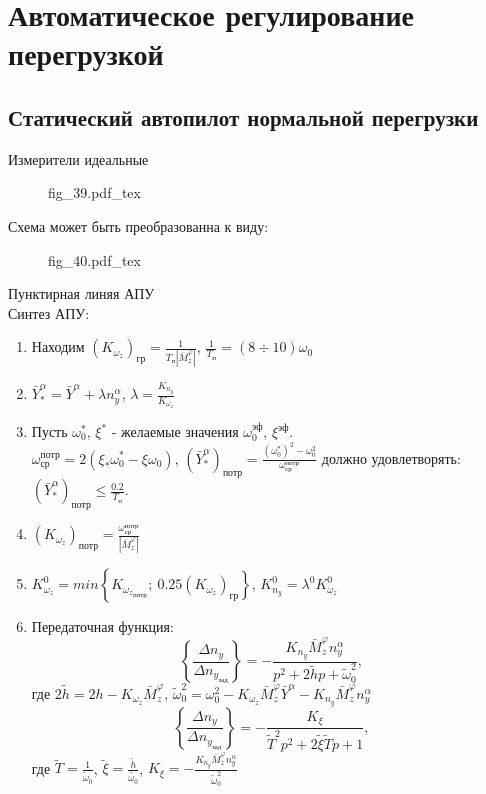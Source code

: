 \documentclass{article}
\begin{document}
\section{Автоматическое регулирование перегрузкой}
\subsection{Статический автопилот нормальной перегрузки}
Измерители идеальные 
\begin{figure}[H]
	\centering
	{fig_39.pdf_tex}
\end{figure}

Схема может быть преобразованна к виду:

\begin{figure}[H]
	\centering
	{fig_40.pdf_tex}
\end{figure}

Пунктирная линяя АПУ\\
Синтез АПУ:
\begin{enumerate}
	\item Находим $(K_{\omega_z})_\text{гр} =\frac{1}{T_\text{п} |\bar{M}_z^{\varphi}|}$, $\frac{1}{T_\text{п}} = (8 \div 10)\omega_0$
	\item $\bar{Y}_*^\alpha =\bar{Y}^\alpha + \lambda n_y^\alpha$, $\lambda = \frac{K_{n_y}}{K_{\omega_z}}$
	\item Пусть $\omega_0^*$, $\xi^*$ - желаемые значения $\omega_0^{\text{эф}}$, $\xi^{\text{эф}}$.\\
	      $\omega_\text{ср}^\text{потр} = 2 (\xi_* \omega_0^* - \xi \omega_0)$, $(\bar{Y}_*^\alpha)_\text{потр} = \frac{(\omega_0^*)^2 - \omega_0^2}{\omega_\text{ср}^\text{потр}}$
	      должно удовлетворять: $(\bar{Y}_*^\alpha)_\text{потр} \leq \frac{0.2}{T_\text{п}}$.
	\item $(K_{\omega_z})_\text{потр} = \frac{\omega_\text{ср}^\text{потр}}{|\bar{M}_z^\varphi|}$
	\item $K_{\omega_z}^0 = min \left\{ K_{{\omega_z}_\text{потр}};\ 0.25(K_{\omega_z})_\text{гр} \right\}$, $K_{n_y}^0 = \lambda^0 K_{\omega_z}^0$
	\item Передаточная функция:
	      \[
		      \left\{\frac{\Delta n_y}{\Delta n_{y_\text{зад}}} \right\}  = -\frac{K_{n_y}\bar{M}_z^\varphi n_y^\alpha }{p^2 + 2 \tilde{h} p + \tilde{\omega}_0^2},
	      \]
	      где $2 \tilde{h} = 2h - K_{\omega_z} \bar{M}_z^\varphi$, $\tilde{\omega}^{2}_0= \omega_0^2 - K_{\omega_z} \bar{M}_z^\varphi \bar{Y}^\alpha - K_{n_y} \bar{M}_z^\varphi n_y^\alpha$
	      \[
		      \left\{\frac{\Delta n_y}{\Delta n_{y_\text{зад}}} \right\} = -\frac{K_{\xi}}{\tilde{T}^2 p^2 + 2 \tilde{\xi} \tilde{T}p + 1}, 
	      \]
	      где $\tilde{T} = \frac{1}{\tilde{\omega}_0}$, $\tilde{\xi} =\frac{\tilde{h}}{\tilde{\omega_{0}}}$, $K_\xi = -\frac{K_{n_y} \bar{M}_z^\varphi n_y^\alpha}{\tilde{\omega}_0^2}$
\end{enumerate}
\end{document}
